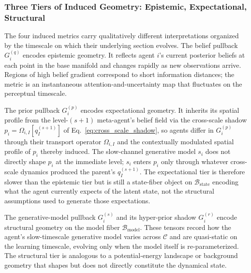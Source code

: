 \documentclass[11pt]{article}
\begin{document}
\subsubsection{Three Tiers of Induced Geometry: Epistemic, Expectational, Structural}
\label{sec:three_tiers}

The four induced metrics carry qualitatively different interpretations organized by the timescale on which their underlying section evolves. The belief pullback $G_i^{(q)}$ encodes epistemic geometry. It reflects agent $i$'s current posterior beliefs at each point in the base manifold and changes rapidly as new observations arrive. Regions of high belief gradient correspond to short information distances; the metric is an instantaneous attention-and-uncertainty map that fluctuates on the perceptual timescale.

The prior pullback $G_i^{(p)}$ encodes expectational geometry. It inherits its spatial profile from the level-$(s{+}1)$ meta-agent's belief field via the cross-scale shadow $p_i = \Omega_{i,I}[q_I^{(s+1)}]$ of Eq.~\eqref{eq:cross_scale_shadow}, so agents differ in $G_i^{(p)}$ through their transport operator $\Omega_{i,I}$ and the contextually modulated spatial profile of $p_i$ thereby induced. The slow-channel generative model $s_i$ does not directly shape $p_i$ at the immediate level; $s_i$ enters $p_i$ only through whatever cross-scale dynamics produced the parent's $q_I^{(s+1)}$. The expectational tier is therefore slower than the epistemic tier but is still a state-fiber object on $\mathcal{B}_{\mathrm{state}}$ encoding what the agent currently expects of the latent state, not the structural assumptions used to generate those expectations.

The generative-model pullback $G_i^{(s)}$ and its hyper-prior shadow $G_i^{(r)}$ encode structural geometry on the model fiber $\mathcal{B}_{\mathrm{model}}$. These tensors record how the agent's slow-timescale generative model varies across $\mathcal{C}$ and are quasi-static on the learning timescale, evolving only when the model itself is re-parameterized. The structural tier is analogous to a potential-energy landscape or background geometry that shapes but does not directly constitute the dynamical state.
\end{document}
